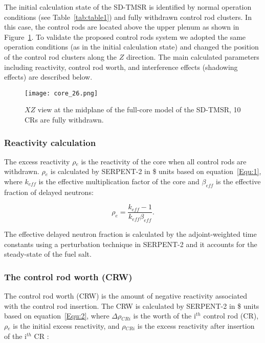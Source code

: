 The initial calculation state of the SD-TMSR is identified by normal operation 
conditions (see Table~\ref{tab:table1}) and fully withdrawn control rod 
clusters. In this case, the control rods are located above the upper plenum as 
shown in Figure~\ref{fig:core_26}. To validate the proposed control rods 
system we adopted the same operation conditions (as in the initial calculation 
state) and changed the position of the control rod clusters along the $Z$ 
direction. The main calculated parameters including reactivity, control rod 
worth, and interference effects (shadowing effects) are described below.

\begin{figure}[t!] %
	\centering
	\texttt{[image: core\_26.png]}
	\caption{$XZ$ view at the midplane of the full-core model of the SD-TMSR, 10 CRs are fully withdrawn.}
	\label{fig:core_26}
\end{figure}

\subsubsection{Reactivity calculation}

The excess reactivity $\rho$$_e$ is the reactivity of the core when all control rods are withdrawn. $\rho$$_e$ is calculated by SERPENT-2 in \$ units based on equation~\ref{Equ:1}, where $k_{eff}$ is the effective multiplication factor of the core and $\beta_{eff}$ is the effective fraction of delayed neutrons:

\begin{equation}
\label{Equ:1}
{{\rho}_{e}}=\dfrac{{k_{eff}}-1}{{k_{eff}}{{\beta}_{eff}}}.
\end{equation}

The effective delayed neutron fraction is calculated by the adjoint-weighted time constants using a perturbation technique in SERPENT-2 \cite{leppanen2014calculation} and it accounts for the steady-state of the fuel salt.

\subsubsection{The control rod worth (CRW)}

The control rod worth (CRW) is the amount of negative reactivity associated with the control rod insertion. The CRW is calculated by SERPENT-2 in \$ units based on equation~\ref{Equ:2}, where $\Delta\rho$$_{CRi}$ is the worth of the i$^{th}$ control rod (CR), $\rho$$_e$ is the initial excess reactivity, and $\rho$$_{CRi}$ is the excess reactivity after insertion of the i$^{th}$ CR \cite{vcerba2017optimization}:

